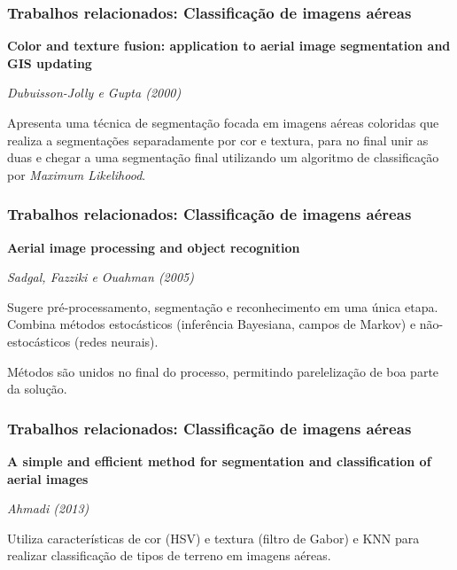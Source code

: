 \documentclass[t]{beamer}
\begin{document}
\begin{frame}
	\frametitle{Trabalhos relacionados: Classificação de imagens aéreas}
	
	\textbf{Color and texture fusion: application to aerial image segmentation and GIS updating}
	
	\textit{Dubuisson-Jolly e Gupta (2000)}
	
	\vspace{0.5cm}
	
	Apresenta uma técnica de segmentação focada em imagens aéreas coloridas que realiza a segmentações separadamente por cor e textura, para no final unir as duas e chegar a uma segmentação final utilizando um algoritmo de classificação por \textit{Maximum Likelihood}.

\end{frame}

\begin{frame}
	\frametitle{Trabalhos relacionados: Classificação de imagens aéreas}
	
	\textbf{Aerial image processing and object recognition}
	
	\textit{Sadgal, Fazziki e Ouahman (2005)}
	
	\vspace{0.5cm}
	
	Sugere pré-processamento, segmentação e reconhecimento em uma única etapa. Combina métodos estocásticos (inferência Bayesiana, campos de Markov) e não-estocásticos (redes neurais).

	\vspace{0.5cm}
	
	Métodos são unidos no final do processo, permitindo parelelização de boa parte da solução.

\end{frame}

\begin{frame}
	\frametitle{Trabalhos relacionados: Classificação de imagens aéreas}
	
	\textbf{A simple and efficient method for segmentation and classification of aerial images}
	
	\textit{Ahmadi (2013)}
	
	\vspace{0.5cm}
	
	Utiliza características de cor (HSV) e textura (filtro de Gabor) e KNN para  realizar classificação de tipos de terreno em imagens aéreas.

\end{frame}
\end{document}
